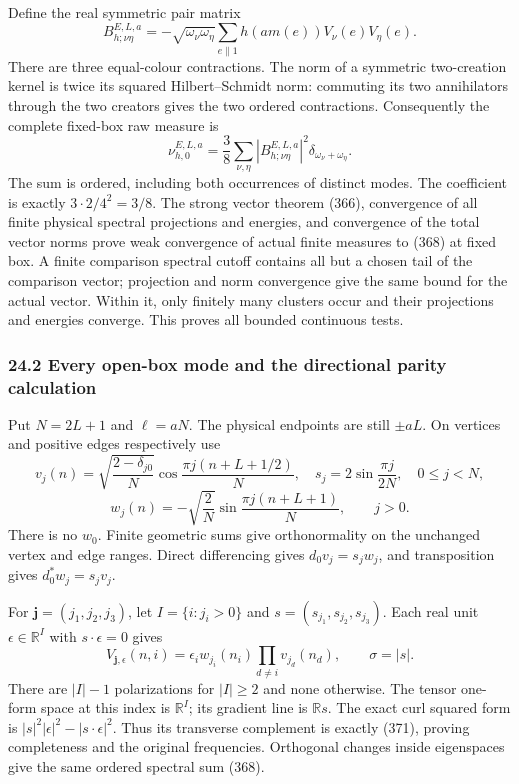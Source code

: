 \documentclass[
  11pt,
]{article}
\begin{document}
Define the real symmetric pair matrix \[
 B^{E,L,a}_{h;\nu\eta}
 =-\sqrt{\omega_\nu\omega_\eta}
       \sum_{e\parallel1}h(am(e))V_\nu(e)V_\eta(e).
 \tag{367}
\] There are three equal-colour contractions. The norm of a symmetric
two-creation kernel is twice its squared Hilbert--Schmidt norm:
commuting its two annihilators through the two creators gives the two
ordered contractions. Consequently the complete fixed-box raw measure is
\[
 \boxed{\nu^{E,L,a}_{h,0}
 =\frac38\sum_{\nu,\eta}|B^{E,L,a}_{h;\nu\eta}|^2
          \delta_{\omega_\nu+\omega_\eta}.}
 \tag{368}
\] The sum is ordered, including both occurrences of distinct modes. The
coefficient is exactly \(3\cdot2/4^2=3/8\). The strong vector theorem
(366), convergence of all finite physical spectral projections and
energies, and convergence of the total vector norms prove weak
convergence of actual finite measures to (368) at fixed box. A finite
comparison spectral cutoff contains all but a chosen tail of the
comparison vector; projection and norm convergence give the same bound
for the actual vector. Within it, only finitely many clusters occur and
their projections and energies converge. This proves all bounded
continuous tests.

\subsubsection{24.2 Every open-box mode and the directional parity
calculation}\label{every-open-box-mode-and-the-directional-parity-calculation}

Put \(N=2L+1\) and \(\ell=aN\). The physical endpoints are still
\(\pm aL\). On vertices and positive edges respectively use \[
 v_j(n)=\sqrt{\frac{2-\delta_{j0}}N}
       \cos\frac{\pi j(n+L+1/2)}N,\quad
 s_j=2\sin\frac{\pi j}{2N},\quad 0\le j<N,
 \tag{369}
\] \[
 w_j(n)=-\sqrt{\frac2N}
       \sin\frac{\pi j(n+L+1)}N,\qquad j>0.
 \tag{370}
\] There is no \(w_0\). Finite geometric sums give orthonormality on the
unchanged vertex and edge ranges. Direct differencing gives
\(d_0v_j=s_jw_j\), and transposition gives \(d_0^*w_j=s_jv_j\).

For \(\boldsymbol j=(j_1,j_2,j_3)\), let \(I=\{i:j_i>0\}\) and
\(s=(s_{j_1},s_{j_2},s_{j_3})\). Each real unit
\(\epsilon\in\mathbb R^I\) with \(s\cdot\epsilon=0\) gives \[
 V_{\boldsymbol j,\epsilon}(n,i)
 =\epsilon_iw_{j_i}(n_i)\prod_{d\ne i}v_{j_d}(n_d),
 \qquad \sigma=|s|.
 \tag{371}
\] There are \(|I|-1\) polarizations for \(|I|\ge2\) and none otherwise.
The tensor one-form space at this index is \(\mathbb R^I\); its gradient
line is \(\mathbb Rs\). The exact curl squared form is
\(|s|^2|\epsilon|^2-|s\cdot\epsilon|^2\). Thus its transverse complement
is exactly (371), proving completeness and the original frequencies.
Orthogonal changes inside eigenspaces give the same ordered spectral sum
(368).
\end{document}
